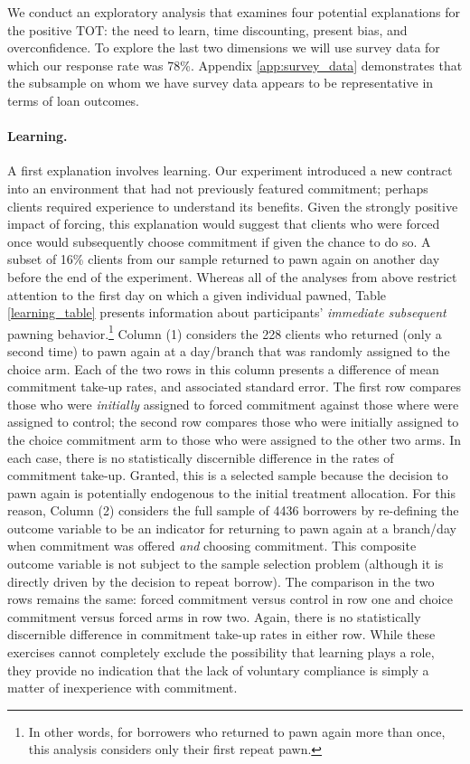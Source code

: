 \documentclass[oneside,11pt]{article}
\begin{document}
We conduct an exploratory analysis that examines four potential explanations for the positive $\text{TOT}$:  the need to learn, time discounting, present bias, and overconfidence.  To explore the last two dimensions we will use survey data for which our response rate was 78\%.  Appendix \ref{app:survey_data} demonstrates that the subsample on whom we have survey data appears to be representative in terms of loan outcomes.   


\paragraph{Learning.} A first explanation involves learning. Our experiment introduced a new contract into an environment that had not previously featured commitment; perhaps clients required experience to understand its benefits. Given the strongly positive impact of forcing, this explanation would suggest that clients who were forced once would subsequently choose commitment if given the chance to do so. 
A subset of 16\% clients from our sample returned to pawn again on another day before the end of the experiment. Whereas all of the analyses from above restrict attention to the first day on which a given individual pawned, Table \ref{learning_table} presents information about participants' \emph{immediate subsequent} pawning behavior.\footnote{In other words, for borrowers who returned to pawn again more than once, this analysis considers only their first repeat pawn.} Column (1) considers the 228 clients who returned (only a second time) to pawn again at a day/branch that was randomly assigned to the choice arm. Each of the two rows in this column presents a difference of mean commitment take-up rates, and associated standard error. The first row compares those who were \emph{initially} assigned to forced commitment against those where were assigned to control; the second row compares those who were initially assigned to the choice commitment arm to those who were assigned to the other two arms. In each case, there is no statistically discernible difference in the rates of commitment take-up. Granted, this is a selected sample because the decision to pawn again is potentially endogenous to the initial treatment allocation. For this reason, Column (2) considers the full sample of 4436 borrowers by re-defining the outcome variable to be an indicator for returning to pawn again at a branch/day when commitment was offered \emph{and} choosing commitment. This composite outcome variable is not subject to the sample selection problem (although it is directly driven by the decision to repeat borrow). The comparison in the two rows remains the same: forced commitment versus control in row one and choice commitment versus forced arms in row two. Again, there is no statistically discernible difference in commitment take-up rates in either row. While these exercises cannot completely exclude the possibility that learning plays a role, they provide no indication that the lack of voluntary compliance is simply a matter of inexperience with commitment.
\end{document}
